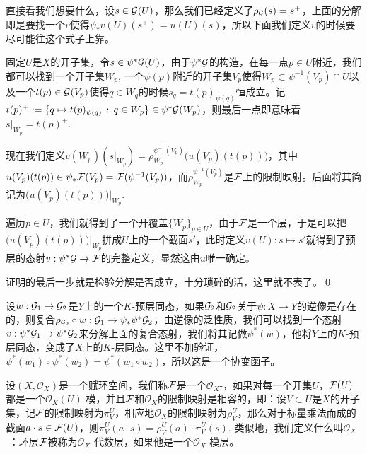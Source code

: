 	直接看我们想要什么，设$s\in \mathcal{G}(U)$，那么我们已经定义了$\rho_{\mathcal{G}}(s)=s^+$，上面的分解即是要找一个$v$使得$\psi_*v(U)(s^+)=u(U)(s)$，所以下面我们定义$v$的时候要尽可能往这个式子上靠。

	固定$U$是$X$的开子集，令$s\in \psi^*\mathcal{G}(U)$，由于$\psi^*\mathcal{G}$的构造，在每一点$p\in U$附近，我们都可以找到一个开子集$W_p$, 一个$\psi(p)$附近的开子集$V_p$使得$W_p\subset \psi^{-1}(V_p)\cap U$以及一个$t(p)\in \mathcal{G}(V_p)$使得$q\in W_q$的时候$s_q=t(p)_{\psi(q)}$恒成立。记$t(p)^+:=\{q\mapsto t(p)_{\psi(q)}\,:\, q\in W_p\}\in \psi^*\mathcal{G}(W_p)$，则最后一点即意味着$s|_{W_p}=t(p)^+$. 

	现在我们定义$v(W_p)(s|_{W_p})=\rho^{\psi^{-1}(V_p)}_{W_p}\bigl(u(V_p)(t(p))\bigr)$，其中$u(V_p)(t(p))\in \psi_*\mathcal{F}(V_p)=\mathcal{F}(\psi^{-1}(V_p))$，而$\rho^{\psi^{-1}(V_p)}_{W_p}$是$\mathcal{F}$上的限制映射。后面将其简记为$\bigl(u(V_p)(t(p))\bigr)|_{W_p}$.

	遍历$p\in U$，我们就得到了一个开覆盖$\{W_p\}_{p\in U}$，由于$\mathcal{F}$是一个层，于是可以把$\bigl(u(V_p)(t(p))\bigr)|_{W_p}$拼成$U$上的一个截面$s'$，此时定义$v(U):s\mapsto s'$就得到了预层的态射$v:\psi^*\mathcal{G} \to \mathcal{F}$的完整定义，显然这由$u$唯一确定。

	证明的最后一步就是检验分解是否成立，十分琐碎的活，这里就不表了。\qed


\para 设$w:\mathcal{G}_1\to \mathcal{G}_2$是$Y$上的一个$K$-预层同态，如果$\mathcal{G}_2$和$\mathcal{G}_2$关于$\psi:X\to Y$的逆像是存在的，则复合$\rho_{\mathcal{G}_2}\circ w:\mathcal{G}_1\to \psi_*\psi^*\mathcal{G}_2$，由逆像的泛性质，我们可以找到一个态射$v:\psi^*\mathcal{G}_1\to \psi^*\mathcal{G}_2$来分解上面的复合态射，我们将其记做$\psi^*(w)$，他将$Y$上的$K$-预层同态，变成了$X$上的$K$-层同态。这里不加验证，$\psi^*(w_1)\circ \psi^*(w_2)=\psi^*(w_1\circ w_2)$，所以这是一个协变函子。

\para 设$(X,\mathcal{O}_X)$是一个赋环空间，我们称$\mathcal{F}$是一个$\mathcal{O}_X$-，如果对每一个开集$U$，$\mathcal{F}(U)$都是一个$\mathcal{O}_X(U)$-模，并且$\mathcal{F}$和$\mathcal{O}_X$的限制映射是相容的，即：设$V\subset U$是$X$的开子集，记$\mathcal{F}$的限制映射为$\pi^U_V$，相应地$\mathcal{O}_X$的限制映射为$\rho^U_V$，那么对于标量乘法而成的截面$a\cdot s\in\mathcal{F}(U)$，则$\pi^U_V(a\cdot s)=\rho^U_V(a)\cdot \pi^U_V(s)$. 类似地，我们定义什么叫$\mathcal{O}_X$-：环层$\mathcal{F}$被称为$\mathcal{O}_X$-代数层，如果他是一个$\mathcal{O}_X$-模层。

